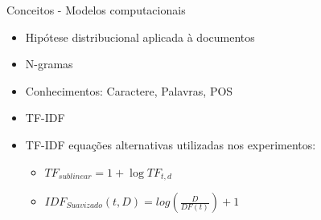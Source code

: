 \begin{frame}{Conceitos - Modelos computacionais}
\begin{tcolorbox}[title=Modelo tradicional de representação textual,valign=center]
	\begin{itemize}
		\item Hipótese distribucional aplicada à documentos \cite{Turney2010}
		\item N-gramas
		\item Conhecimentos: Caractere, Palavras, POS
		\item TF-IDF
		\item TF-IDF equações alternativas utilizadas nos experimentos:
			\begin{itemize}
				\item $ TF_{sublinear} = 1 + \log TF_{t,d}$ 
				\item $
				IDF_{Suavizado}(t,D) = log\left (
				\frac{D}{DF(t)}
				\right ) + 1
				$
			\end{itemize}
	\end{itemize}	
\end{tcolorbox}
\end{frame}



